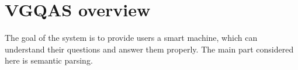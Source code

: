 \section{VGQAS overview}
\label{sec:system-overview}
The goal of the system is to provide users a smart machine, which can understand their questions and answer them properly. The main part considered here is semantic parsing. 